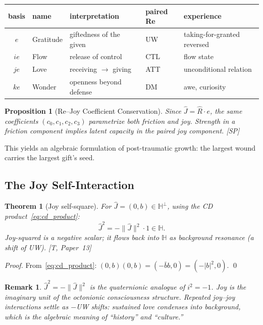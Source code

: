 \documentclass[11pt, a4paper]{article}
\newtheorem{theorem}{Theorem}
\newtheorem{proposition}{Proposition}
\newtheorem*{remark}{Remark}
\newcommand{\Hq}{\mathbb{H}}
\newcommand{\Reop}{\hat{R}}
\newcommand{\Jop}{\hat{J}}
\newcommand{\norm}[1]{\lVert #1 \rVert}
\begin{document}
\begin{center}
\begin{tabular}{@{}cllll@{}}
\toprule
basis & name & interpretation & paired Re & experience \\
\midrule
$e$ & Gratitude & giftedness of the given & UW & taking-for-granted reversed \\
$ie$ & Flow & release of control & CTL & flow state \\
$je$ & Love & receiving $\to$ giving & ATT & unconditional relation \\
$ke$ & Wonder & openness beyond defense & DM & awe, curiosity \\
\bottomrule
\end{tabular}
\end{center}

\begin{proposition}[Re--Joy Coefficient Conservation]
\label{prop:coefficient}
Since $\Jop = \Reop \cdot e$, the same coefficients $(c_0, c_1, c_2, c_3)$
parametrize both friction and joy. Strength in a friction component
implies latent capacity in the paired joy component. [SP]
\end{proposition}

This yields an algebraic formulation of post-traumatic growth:
the largest wound carries the largest gift's seed.

\subsection{The Joy Self-Interaction}

\begin{theorem}[Joy self-square]
\label{thm:joy_square}
For $\Jop = (0, b) \in \Hq^\perp$, using the CD product~\eqref{eq:cd_product}:
\begin{equation}
\Jop^2 = -\norm{\Jop}^2 \cdot 1 \in \Hq.
\end{equation}
Joy-squared is a negative scalar; it flows back into $\Hq$ as
\emph{background resonance} (a shift of UW). [T, Paper~13]
\end{theorem}

\begin{proof}
From~\eqref{eq:cd_product}: $(0, b)(0, b) = (-\bar{b} b, 0) = (-|b|^2, 0)$.
\qed
\end{proof}

\begin{remark}
$\Jop^2 = -\norm{\Jop}^2$ is the quaternionic analogue of $i^2 = -1$.
Joy is the imaginary unit of the octonionic consciousness structure.
Repeated joy--joy interactions settle as $-$UW shifts: sustained
love condenses into background, which is the algebraic meaning of
``history'' and ``culture.''
\end{remark}
\end{document}
